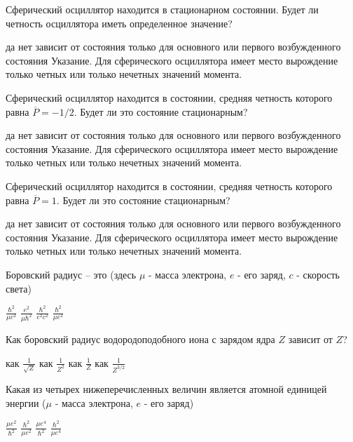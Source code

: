 \documentclass[11pt,a4paper]{exam}
\begin{document}
\begin{questions}
\question Сферический осциллятор находится в стационарном состоянии. Будет ли четность осциллятора иметь определенное значение?
\begin{choices}
\choice да          
\choice нет      
\choice зависит от состояния 
\choice только для основного или первого возбужденного состояния
Указание. Для сферического осциллятора имеет место вырождение только четных или только нечетных значений момента.
\end{choices}

\question Сферический осциллятор находится в состоянии, средняя четность которого равна $\overline P  =  - 1/2$. Будет ли это состояние стационарным? 
\begin{choices}
\choice да          
\choice нет      
\choice зависит от состояния 
\choice только для основного или первого возбужденного состояния
Указание. Для сферического осциллятора имеет место вырождение только четных или только нечетных значений момента.
\end{choices}

\question Сферический осциллятор находится в состоянии, средняя четность которого равна $\overline P  = 1$. Будет ли это состояние стационарным? 
\begin{choices}
\choice да          
\choice нет      
\choice зависит от состояния 
\choice только для основного или первого возбужденного состояния
Указание. Для сферического осциллятора имеет место вырождение только четных или только нечетных значений момента.
\end{choices}

\question Боровский радиус – это (здесь $\mu $ - масса электрона, $e$ - его заряд, $c$ - скорость света)
\begin{choices}
\choice $\frac{{{\hbar ^2}}}{{\mu {c^2}}}$     
\choice $\frac{{{e^2}}}{{\mu {\hbar ^2}}}$     
\choice $\frac{{{\hbar ^2}}}{{{e^2}{c^2}}}$    
\choice $\frac{{{\hbar ^2}}}{{\mu {e^2}}}$
\end{choices}

\question Как боровский радиус водородоподобного иона с зарядом ядра $Z$ зависит от $Z$?
\begin{choices}
\choice как $\frac{1}{{\sqrt Z }}$    
\choice как $\frac{1}{{{Z^2}}}$    
\choice как $\frac{1}{Z}$    
\choice как $\frac{1}{{{Z^{3/2}}}}$
\end{choices}

\question Какая из четырех нижеперечисленных величин является атомной единицей энергии ($\mu $ - масса электрона, $e$ - его заряд)
\begin{choices}
\choice $\frac{{\mu {e^2}}}{{{\hbar ^2}}}$     
\choice $\frac{{{\hbar ^2}}}{{\mu {e^2}}}$        
\choice $\frac{{\mu {e^4}}}{{{\hbar ^2}}}$     
\choice $\frac{{{\hbar ^2}}}{{\mu {e^4}}}$
\end{choices}


\end{questions}
\end{document}
